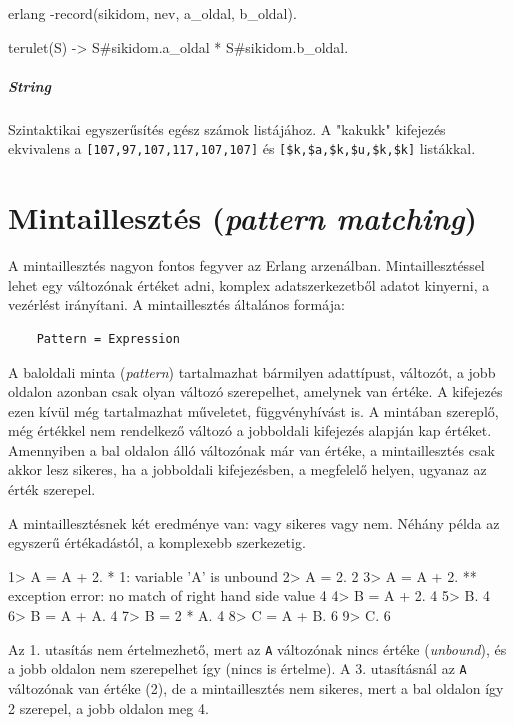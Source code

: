 \documentclass[12pt, a4paper, oneside]{book}
\begin{document}
\begin{code}{erlang}{}
-record(sikidom, { nev, a_oldal, b_oldal}).

terulet(S) ->
  S#sikidom.a_oldal * S#sikidom.b_oldal.
\end{code}

\subparagraph{String} Szintaktikai egyszerűsítés egész számok listájához. A
"kakukk" kifejezés ekvivalens a \texttt{[107,97,107,117,107,107]} és 
\texttt{[\$k,\$a,\$k,\$u,\$k,\$k]} listákkal.

\section{Mintaillesztés (\emph{pattern matching})}
A mintaillesztés nagyon fontos fegyver az Erlang arzenálban. Mintaillesztéssel
lehet egy változónak értéket adni, komplex adatszerkezetből adatot kinyerni,
a vezérlést irányítani. A mintaillesztés általános formája:

\begin{verbatim}
    Pattern = Expression
\end{verbatim}

\noindent A baloldali minta (\emph{pattern}) tartalmazhat bármilyen adattípust,
változót, a jobb oldalon azonban csak olyan változó szerepelhet, amelynek van
értéke. A kifejezés ezen kívül még tartalmazhat műveletet, függvényhívást is. A
mintában szereplő, még értékkel nem rendelkező változó a jobboldali kifejezés
alapján kap értéket. Amennyiben a bal oldalon álló változónak már van értéke, a
mintaillesztés csak akkor lesz sikeres, ha a jobboldali kifejezésben, a
megfelelő helyen, ugyanaz az érték szerepel.

A mintaillesztésnek két eredménye van: vagy sikeres vagy nem. Néhány példa az
egyszerű értékadástól, a komplexebb szerkezetig.

\begin{code}{}{}
1> A = A + 2.
* 1: variable 'A' is unbound
2> A = 2.
2
3> A = A + 2.
** exception error: no match of right hand side value 4
4> B = A + 2.
4
5> B.
4
6> B = A + A.
4
7> B = 2 * A.
4
8> C = A + B.
6
9> C.
6
\end{code}

\noindent Az 1. utasítás nem értelmezhető, mert az \texttt{A} változónak nincs értéke
(\emph{unbound}), és a jobb oldalon nem szerepelhet így (nincs is értelme). A 3.
utasításnál az \texttt{A} változónak van értéke (2), de a mintaillesztés nem
sikeres, mert a bal oldalon így 2 szerepel, a jobb oldalon meg 4.
\end{document}
